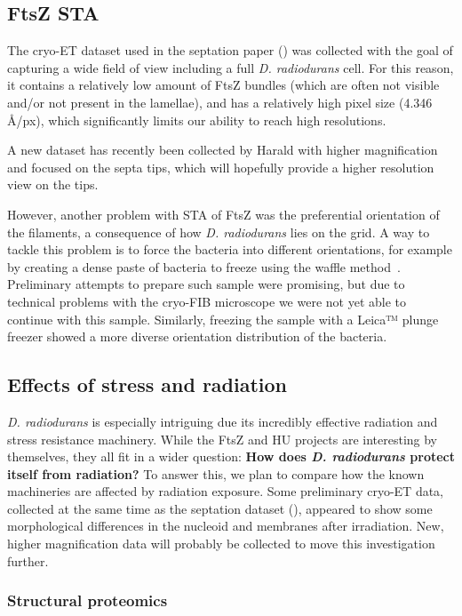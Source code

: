 \subsection{FtsZ STA}\label{future_ftsz_sta}

The cryo-ET dataset used in the septation paper () was collected with the goal of capturing a wide field of view including a full \textit{D. radiodurans} cell.
For this reason, it contains a relatively low amount of FtsZ bundles (which are often not visible and/or not present in the lamellae), and has a relatively high pixel size (4.346 Å/px), which significantly limits our ability to reach high resolutions.

A new dataset has recently been collected by Harald with higher magnification and focused on the septa tips, which will hopefully provide a higher resolution view on the tips.

However, another problem with STA of FtsZ was the preferential orientation of the filaments, a consequence of how \textit{D. radiodurans} lies on the grid.
A way to tackle this problem is to force the bacteria into different orientations, for example by creating a dense paste of bacteria to freeze using the waffle method~\cite{kelleyWaffleMethodGeneral2022}.
Preliminary attempts to prepare such sample were promising, but due to technical problems with the cryo-FIB microscope we were not yet able to continue with this sample.
Similarly, freezing the sample with a Leica™ plunge freezer showed a more diverse orientation distribution of the bacteria.

\subsection{Effects of stress and radiation}

\textit{D. radiodurans} is especially intriguing due its incredibly effective radiation and stress resistance machinery.
While the FtsZ and HU projects are interesting by themselves, they all fit in a wider question: \textbf{How does \textit{D. radiodurans} protect itself from radiation?}
To answer this, we plan to compare how the known machineries are affected by radiation exposure.
Some preliminary cryo-ET data, collected at the same time as the septation dataset (), appeared to show some morphological differences in the nucleoid and membranes after irradiation.
New, higher magnification data will probably be collected to move this investigation further.

\subsubsection{Structural proteomics}

